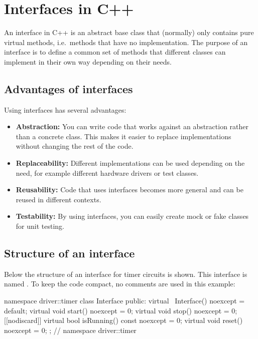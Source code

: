 
\section{Interfaces in C++}
\label{c3:sec:interfaces}\label{c3:app:b}
An interface in C++ is an abstract base class that (normally) only contains pure virtual methods,
i.e.\ methods that have no implementation. The purpose of an interface is to define a common set
of methods that different classes can implement in their own way depending on their needs.

\subsection{Advantages of interfaces}
\label{c3:sec:advantages}
Using interfaces has several advantages:
\begin{itemize}
  \item \textbf{Abstraction:} You can write code that works against an abstraction rather than a
    concrete class. This makes it easier to replace implementations without changing the rest of
    the code.
  \item \textbf{Replaceability:} Different implementations can be used depending on the need, for
    example different hardware drivers or test classes.
  \item \textbf{Reusability:} Code that uses interfaces becomes more general and can be reused in
    different contexts.
  \item \textbf{Testability:} By using interfaces, you can easily create mock or fake classes for
    unit testing.
\end{itemize}

\subsection{Structure of an interface}
\label{c3:sec:structure}
Below the structure of an interface for timer circuits is shown. This interface is named
. To keep the code compact, no comments are used in this example:

\begin{cppcode}
namespace driver::timer
{
class Interface
{
public:
    virtual ~Interface() noexcept = default;
    virtual void start() noexcept = 0;
    virtual void stop() noexcept = 0;
    [[nodiscard]] virtual bool isRunning() const noexcept = 0;
    virtual void reset() noexcept = 0;
};
} // namespace driver::timer
\end{cppcode}

